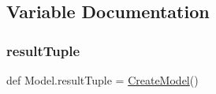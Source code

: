 \subsection{Variable Documentation}
\mbox{\label{namespace_model_a582b7be73263e6c6dd3a72ad8704dcab}} 
\subsubsection{\texorpdfstring{result\+Tuple}{resultTuple}}
{\footnotesize\ttfamily def Model.\+result\+Tuple = \mbox{\hyperlink{namespace_model_ad001b309b55da5b0fee0d0a29b25d8ac}{Create\+Model}}()}


